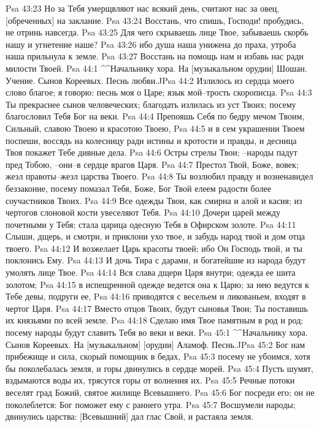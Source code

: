 Psa 43:23  Но за Тебя умерщвляют нас всякий день, считают нас за овец, [обреченных] на заклание.
Psa 43:24  Восстань, что спишь, Господи! пробудись, не отринь навсегда.
Psa 43:25  Для чего скрываешь лице Твое, забываешь скорбь нашу и угнетение наше?
Psa 43:26  ибо душа наша унижена до праха, утроба наша прильнула к земле.
Psa 43:27  Восстань на помощь нам и избавь нас ради милости Твоей.
Psa 44:1  ^^Начальнику хора. На [музыкальном орудии] Шошан. Учение. Сынов Кореевых. Песнь любви.^^
Psa 44:2  Излилось из сердца моего слово благое; я говорю: песнь моя о Царе; язык мой--трость скорописца.
Psa 44:3  Ты прекраснее сынов человеческих; благодать излилась из уст Твоих; посему благословил Тебя Бог на веки.
Psa 44:4  Препояшь Себя по бедру мечом Твоим, Сильный, славою Твоею и красотою Твоею,
Psa 44:5  и в сем украшении Твоем поспеши, воссядь на колесницу ради истины и кротости и правды, и десница Твоя покажет Тебе дивные дела.
Psa 44:6  Остры стрелы Твои; --народы падут пред Тобою, --они--в сердце врагов Царя.
Psa 44:7  Престол Твой, Боже, вовек; жезл правоты--жезл царства Твоего.
Psa 44:8  Ты возлюбил правду и возненавидел беззаконие, посему помазал Тебя, Боже, Бог Твой елеем радости более соучастников Твоих.
Psa 44:9  Все одежды Твои, как смирна и алой и касия; из чертогов слоновой кости увеселяют Тебя.
Psa 44:10  Дочери царей между почетными у Тебя; стала царица одесную Тебя в Офирском золоте.
Psa 44:11  Слыши, дщерь, и смотри, и приклони ухо твое, и забудь народ твой и дом отца твоего.
Psa 44:12  И возжелает Царь красоты твоей; ибо Он Господь твой, и ты поклонись Ему.
Psa 44:13  И дочь Тира с дарами, и богатейшие из народа будут умолять лице Твое.
Psa 44:14  Вся слава дщери Царя внутри; одежда ее шита золотом;
Psa 44:15  в испещренной одежде ведется она к Царю; за нею ведутся к Тебе девы, подруги ее,
Psa 44:16  приводятся с весельем и ликованьем, входят в чертог Царя.
Psa 44:17  Вместо отцов Твоих, будут сыновья Твои; Ты поставишь их князьями по всей земле.
Psa 44:18  Сделаю имя Твое памятным в род и род; посему народы будут славить Тебя во веки и веки.
Psa 45:1  ^^Начальнику хора. Сынов Кореевых. На [музыкальном] [орудии] Аламоф. Песнь.^^
Psa 45:2  Бог нам прибежище и сила, скорый помощник в бедах,
Psa 45:3  посему не убоимся, хотя бы поколебалась земля, и горы двинулись в сердце морей.
Psa 45:4  Пусть шумят, вздымаются воды их, трясутся горы от волнения их.
Psa 45:5  Речные потоки веселят град Божий, святое жилище Всевышнего.
Psa 45:6  Бог посреди его; он не поколеблется: Бог поможет ему с раннего утра.
Psa 45:7  Восшумели народы; двинулись царства: [Всевышний] дал глас Свой, и растаяла земля.
